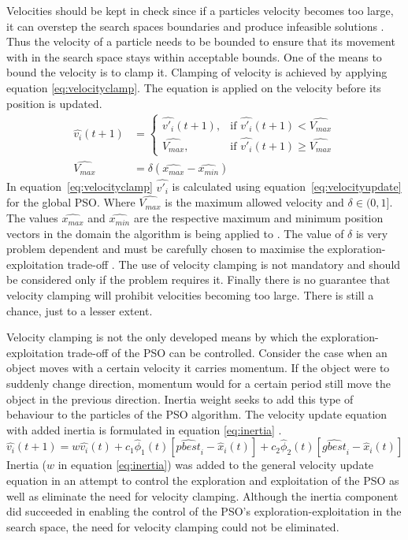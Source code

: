 Velocities should be kept in check since if a particles velocity becomes too large, it can overstep the search spaces boundaries and produce infeasible solutions \cite{FundamentalSwarm}. Thus the velocity of a particle needs to be bounded to ensure that its movement with in the search space stays within acceptable bounds. One of the means to bound the velocity is to clamp it. Clamping of velocity is achieved by applying equation \ref{eq:velocityclamp}. The equation is applied on the velocity before its position is updated\cite{FundamentalSwarm}.
\begin{align}
	\hat{v_i}(t+1) &=
	\begin{cases}
	\hat{v'_i}(t+1), &\text{if $\hat{v'_i}(t+1) < \hat{V_{max}}$}\\
	\hat{V_{max}}, &\text{if $\hat{v'_i}(t+1) \geq \hat{V_{max}}$}
	\end{cases} \label{eq:velocityclamp}\\
	\hat{V_{max}} &= \delta(\hat{x_{max}} - \hat{x_{min}})
\end{align}
In equation~\ref{eq:velocityclamp} $\hat{v'_i}$ is calculated using equation~\ref{eq:velocityupdate} for the global \gls{PSO}. Where $\hat{V_{max}}$ is the maximum allowed velocity and $\delta \in (0,1]$. The values $\hat{x_{max}}$ and $\hat{x_{min}}$ are the respective maximum and minimum position vectors in the domain the algorithm is being applied to \cite{FundamentalSwarm}. The value of $\delta$ is very problem dependent and must be carefully chosen to maximise the exploration-exploitation trade-off \cite{FundamentalSwarm}. The use of velocity clamping is not mandatory and should be considered only if the problem requires it\cite{FundamentalSwarm}. Finally there is no guarantee that velocity clamping will prohibit velocities becoming too large\cite{FundamentalSwarm}. There is still a chance, just to a lesser extent\cite{FundamentalSwarm}.

Velocity clamping is not the only developed means by which  the exploration-exploitation trade-off of the \gls{PSO} can be controlled. Consider the case when an object moves with a certain velocity it carries momentum. If the object were to suddenly change direction, momentum would for a certain period still move the object in the previous direction. Inertia weight seeks to add this type of behaviour to the particles of the \gls{PSO} algorithm. The velocity update equation with added inertia is formulated in equation \ref{eq:inertia} \cite{FundamentalSwarm}.
\begin{equation}
\hat{v_i}(t+1) = w\hat{v_i}(t) + c_1\hat{\phi}_1(t)[\hat{pbest}_i - \hat{x}_i(t)] + c_2\hat{\phi}_2(t)[\hat{gbest}_i - \hat{x}_i(t)]\label{eq:inertia}
\end{equation}
Inertia ($w$ in equation \ref{eq:inertia}) was added to the general velocity update equation in an attempt to control the exploration and exploitation of the \gls{PSO} as well as eliminate the need for velocity clamping\cite{FundamentalSwarm}. Although the inertia component did succeeded in enabling the control of the \gls{PSO}'s exploration-exploitation in the search space, the need for velocity clamping could not be eliminated\cite{FundamentalSwarm}.

